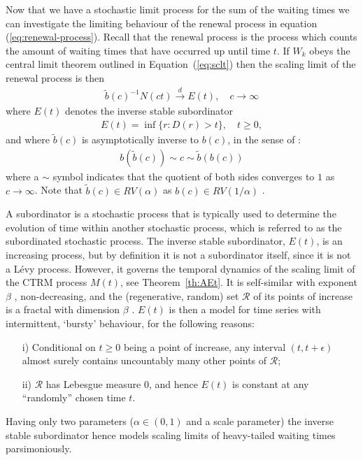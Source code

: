 \documentclass[honours,12pt,twoside, openright]{unswthesis}
\newcommand{\1}{\mathbf 1}
\newcommand{\cd}{\overset{d}{\longrightarrow}}
\numberwithin{equation}{section}
\theoremstyle{definition}
\theoremstyle{remark}
\begin{document}
Now that we have a stochastic limit process for the sum of the waiting times we can investigate the limiting behaviour of the renewal process in equation (\ref{eq:renewal-process}). Recall that the renewal process is the process which counts the amount of waiting times that have occurred up until time $t$. If $W_k$ obeys the central limit theorem outlined in Equation~(\ref{eq:sclt}) then the scaling limit of the renewal process is then \cite{limitCTRW}
\begin{align}
\tilde b(c)^{-1}N(ct) \cd E(t), \quad c \to \infty
\end{align}
where $E(t)$ denotes the inverse stable subordinator \cite{invSubord}
\begin{align}\label{eq:invStable}
E(t) = \inf\{r: D(r) > t\}, \quad t \ge 0,
\end{align}
and where $\tilde b(c)$ is asymptotically inverse to $b(c)$, in the sense
of \cite[p.20]{seneta}: 
\begin{align}\label{eq:tildeb}
b(\tilde b(c)) \sim c \sim \tilde b(b(c))
\end{align}
where a $\sim$ symbol indicates that the quotient of both sides converges to
$1$ as $c \to \infty$. 
Note that $\tilde b(c) \in RV(\alpha)$ as $b(c) \in RV(1/\alpha)$ \cite[Prop~4.15]{MeerschaertSikorskii2012}. 

A subordinator is a stochastic process that is typically used to determine the evolution of time within another stochastic process, which is referred to as the subordinated stochastic process. 
The inverse stable subordinator, $E(t)$, is an increasing process, but by definition
it is not a subordinator itself, since it is not a L\'evy process. 
However, it governs the temporal dynamics of
the scaling limit of the CTRM process $M(t)$, see Theorem~\ref{th:AEt}. 
It is self-similar with exponent $\beta$
\cite{limitCTRW}, non-decreasing, and the (regenerative, random) set 
$\mathcal R$ of its points of increase is a fractal with dimension $\beta$ 
\cite{Bertoin04}.
$E(t)$ is then a model for time series with intermittent, `bursty'
behaviour, for the following reasons:
\begin{itemize}
\item [i)]
Conditional on $t \ge 0$ being a point of increase, any interval 
$(t, t+ \epsilon)$ almost surely contains uncountably many other points of 
$\mathcal R$; 
\item [ii)]
$\mathcal R$ has Lebesgue measure $0$, and hence $E(t)$ is
constant at any ``randomly'' chosen time $t$. 
\end{itemize}
Having only two parameters ($\alpha \in (0,1)$ and a scale parameter)
the inverse stable subordinator hence models scaling limits of heavy-tailed 
waiting times parsimoniously.
\end{document}
